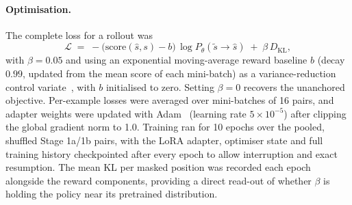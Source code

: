 \paragraph{Optimisation.}
The complete loss for a rollout was
\begin{equation}
\mathcal{L} \;=\; -\bigl(\mathrm{score}(\hat{s},s) - b\bigr)\,\log P_{\theta}(\tilde{s}\to\hat{s}) \;+\; \beta \, D_{\mathrm{KL}},
\label{eq:stage9-loss}
\end{equation}
with $\beta = 0.05$ and using an exponential moving-average reward baseline $b$
(decay $0.99$, updated from the mean score of each mini-batch) as a
variance-reduction control variate~\cite{greensmith2004variance,mnih2014nvil},
with $b$ initialised to zero. Setting $\beta=0$ recovers the unanchored
objective. Per-example losses were averaged over mini-batches of 16 pairs, and
adapter weights were updated with Adam~\cite{kingma2015adam} (learning rate
$5\times10^{-5}$) after clipping the global gradient norm to 1.0. Training ran
for 10 epochs over the pooled, shuffled Stage 1a/1b pairs, with the LoRA
adapter, optimiser state and full training history checkpointed after every
epoch to allow interruption and exact resumption. The mean KL per masked
position was recorded each epoch alongside the reward components, providing a
direct read-out of whether $\beta$ is holding the policy near its pretrained
distribution.

